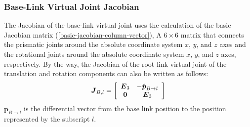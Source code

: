 \subsubsection{Base-Link Virtual Joint Jacobian}
The Jacobian of the base-link virtual joint uses the calculation of the basic Jacobian matrix (\eqref{basic-jacobian-column-vector}),
A $6\times6$ matrix that connects the prismatic joints around the absolute coordinate system $x$, $y$, and $z$ axes and the rotational joints around the absolute coordinate system $x$, $y$, and $z$ axes, respectively.
By the way, the Jacobian of the root link virtual joint of the translation and rotation components can also be written as follows:
\begin{eqnarray}
\labeq{virtual-joint-jacobian}
\bm{J}_{B,l} = 
\left[
\begin{array}{cc}
\bm{E}_3 &
-\hat{\bm{p}}_{B\to l}\\
\bm{0} & \bm{E}_3
\end{array}
\right]
\end{eqnarray}
$\bm{p}_{B\to l}$ is the differential vector from the base link position to the position represented by the subscript $l$.


